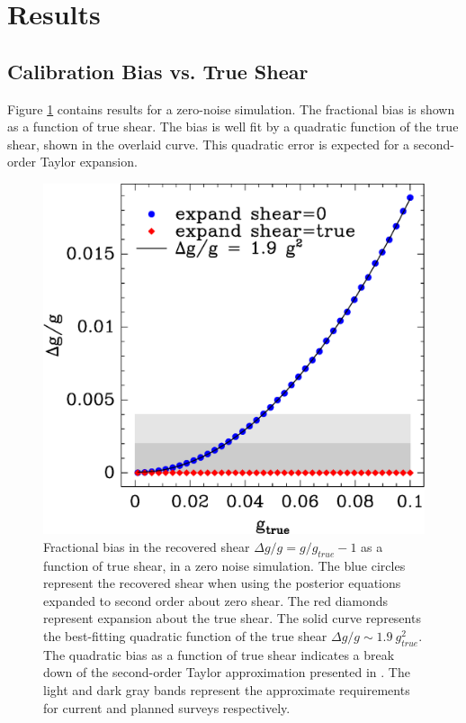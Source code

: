 \documentclass[usegraphicx,usenatbib]{mn2e}
\begin{document}
\section{Results} \label{sec:results}

\subsection{Calibration Bias vs. True Shear} \label{sec:truebias}

Figure \ref{fig:nonoise} contains results for a zero-noise simulation.  The
fractional bias is shown as a function of true shear.  The bias is well fit by
a quadratic function of the true shear, shown in the overlaid curve. This
quadratic error is expected for a second-order Taylor expansion.

\begin{figure}
 \includegraphics[scale=0.45]{figures/fracerr-vs-shear.eps}
 \caption{Fractional bias in the recovered shear $\Delta g/g = g/g_{true}-1$
     as a function of true shear,
     in a zero noise simulation.  The blue circles represent the recovered
     shear when using the posterior equations expanded to second order about
     zero shear.  The red diamonds represent expansion about the true shear.
     The solid curve represents the best-fitting quadratic function of the true
     shear $\Delta g/g \sim 1.9~g^2_{true}$.  The quadratic bias as a function of
     true shear indicates a break down of the second-order Taylor approximation
 presented in \citet{ba14}. The light and dark gray bands represent the
 approximate requirements for current and planned surveys respectively.}
 \label{fig:nonoise}
\end{figure}
\end{document}

